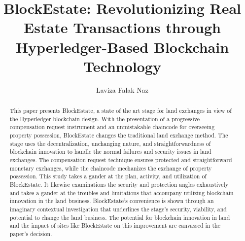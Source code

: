 \documentclass[3p,times]{elsarticle}
\begin{document}
\begin{frontmatter}



\dochead{}

\title{BlockEstate: Revolutionizing Real Estate Transactions through Hyperledger-Based Blockchain Technology}

\author[label1]{Laviza Falak Naz}%
\address[label1]{NED University of Engineering \& Technology}

\begin{abstract}

This paper presents BlockEstate, a state of the art stage for land exchanges in view of the Hyperledger blockchain design. With the presentation of a progressive compensation request instrument and an unmistakable chaincode for overseeing property possession, BlockEstate changes the traditional land exchange method. The stage uses the decentralization, unchanging nature, and straightforwardness of blockchain innovation to handle the normal failures and security issues in land exchanges. The compensation request technique ensures protected and straightforward monetary exchanges, while the chaincode mechanizes the exchange of property possession. This study takes a gander at the plan, activity, and utilization of BlockEstate. It likewise examinations the security and protection angles exhaustively and takes a gander at the troubles and limitations that accompany utilizing blockchain innovation in the land business. BlockEstate's convenience is shown through an imaginary contextual investigation that underlines the stage's security, viability, and potential to change the land business. The potential for blockchain innovation in land and the impact of sites like BlockEstate on this improvement are canvassed in the paper's decision.


\end{abstract}
\end{frontmatter}
\end{document}
